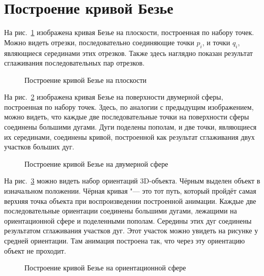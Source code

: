 \section{Построение кривой Безье}

На рис.~\ref{picture-bezier-plane} изображена кривая Безье на плоскости, построенная по набору точек. Можно видеть
отрезки, последовательно соединяющие точки $p_i$, и точки $q_i$, являющиеся серединами этих отрезков. Также здесь
наглядно показан результат сглаживания последовательных пар отрезков.

\begin{figure}[h!]
\caption{Построение кривой Безье на плоскости}
\label{picture-bezier-plane}
\end{figure}

На рис.~\ref{picture-bezier-two-dimension} изображена кривая Безье на поверхности двумерной сферы, построенная
по набору точек. Здесь, по аналогии с предыдущим изображением, можно видеть, что каждые две последовательные точки
на поверхности сферы соединены большими дугами. Дуги поделены пополам, и две точки, являющиеся их серединами,
соединены кривой, построенной как результат сглаживания двух участков больших дуг.

\begin{figure}[h!]
\caption{Построение кривой Безье на двумерной сфере}
\label{picture-bezier-two-dimension}
\end{figure}

На рис.~\ref{picture-bezier-orientation} можно видеть набор ориентаций 3D-объекта. Чёрным выделен объект
в изначальном положении. Чёрная кривая "--- это тот путь, который пройдёт самая верхняя точка объекта при
воспроизведении построенной анимации. Каждые две последовательные ориентации соединены большими дугами, лежащими
на ориентационной сфере и поделенными пополам. Середины этих дуг соединены результатом сглаживания участков дуг.
Этот участок можно увидеть на рисунке у средней ориентации. Там анимация построена так, что через эту ориентацию объект
не проходит.

\begin{figure}[h!]
\caption{Построение кривой Безье на ориентационной сфере}
\label{picture-bezier-orientation}
\end{figure}
